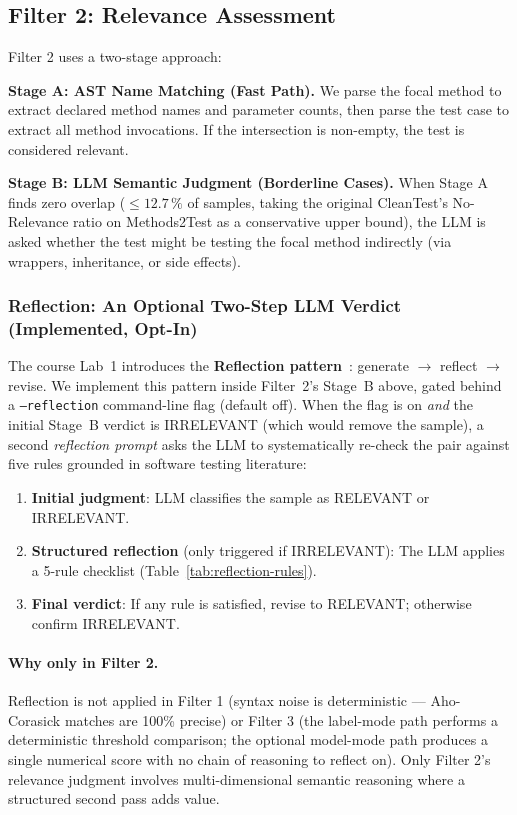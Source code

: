 \documentclass[acmlarge,nonacm,screen]{acmart}
\begin{document}
\subsection{Filter 2: Relevance Assessment}

Filter 2 uses a two-stage approach:

\textbf{Stage A: AST Name Matching (Fast Path).} We parse the focal method to extract declared method names and parameter counts, then parse the test case to extract all method invocations. If the intersection is non-empty, the test is considered relevant.

\textbf{Stage B: LLM Semantic Judgment (Borderline Cases).} When Stage A finds zero overlap ($\leq 12.7\,\%$ of samples, taking the original CleanTest's No-Relevance ratio on Methods2Test as a conservative upper bound), the LLM is asked whether the test might be testing the focal method indirectly (via wrappers, inheritance, or side effects).

\subsubsection{Reflection: An Optional Two-Step LLM Verdict (Implemented, Opt-In)}
\label{sec:reflection-mechanism}

The course Lab~1 introduces the \textbf{Reflection
pattern}~\cite{shinn2023reflexion}: generate $\to$ reflect
$\to$ revise. We implement this pattern inside Filter~2's Stage~B
above, gated behind a \texttt{--reflection} command-line flag
(default off). When the flag is on \emph{and} the initial Stage~B
verdict is \textsc{IRRELEVANT} (which would remove the sample), a
second \emph{reflection prompt} asks the LLM to systematically
re-check the pair against five rules grounded in software testing
literature:

\begin{enumerate}
    \item \textbf{Initial judgment}: LLM classifies the sample as RELEVANT or IRRELEVANT.
    \item \textbf{Structured reflection} (only triggered if IRRELEVANT): The LLM applies a 5-rule checklist (Table~\ref{tab:reflection-rules}).
    \item \textbf{Final verdict}: If any rule is satisfied, revise to RELEVANT; otherwise confirm IRRELEVANT.
\end{enumerate}

\paragraph{Why only in Filter 2.} Reflection is not applied in Filter 1 (syntax noise is deterministic --- Aho-Corasick matches are 100\% precise) or Filter 3 (the label-mode path performs a deterministic threshold comparison; the optional model-mode path produces a single numerical score with no chain of reasoning to reflect on). Only Filter 2's relevance judgment involves multi-dimensional semantic reasoning where a structured second pass adds value.
\end{document}
